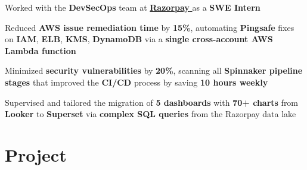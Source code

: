 \documentclass[]{deedy-resume-openfont}
\begin{document}
\begin{minipage}[t]{0.66\textwidth}
\vspace{\topsep} %
\begin{tightemize}
\item Worked with the \textbf{DevSecOps} team at \href{https://github.com/sanam2405/KnowledgeTransfer}{\textbf{Razorpay} } as a \textbf{SWE Intern}
\item Reduced \textbf{AWS issue remediation time} by \textbf{15\%}, automating \textbf{Pingsafe} fixes on \textbf{IAM}, \textbf{ELB}, \textbf{KMS}, \textbf{DynamoDB} via a \textbf{single cross-account AWS Lambda function}
\item Minimized \textbf{security vulnerabilities} by \textbf{20\%}, scanning all \textbf{Spinnaker pipeline stages} that improved the \textbf{CI/CD} process by saving \textbf{10 hours weekly} 
\item Supervised and tailored the migration of \textbf{5 dashboards} with \textbf{70+ charts} from \textbf{Looker} to \textbf{Superset} via \textbf{complex SQL queries} from the Razorpay data lake
\end{tightemize}






\sectionsep
\sectionsep
\section{Project}
\sectionsep


\end{minipage}
\end{document}
